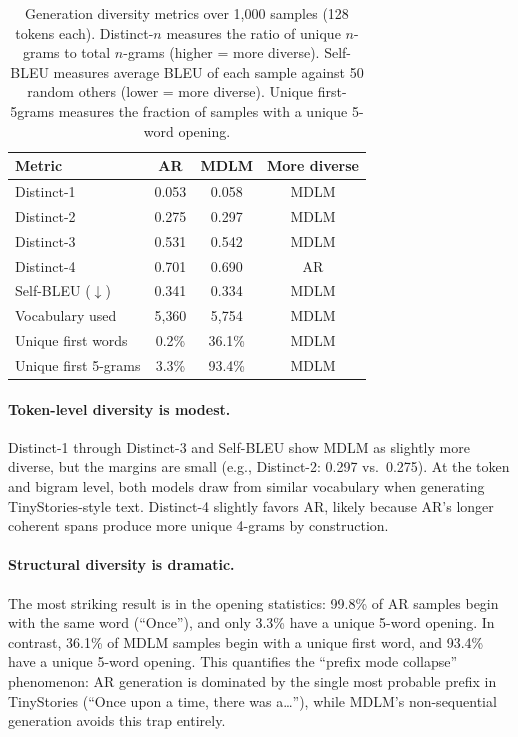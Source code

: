 \documentclass[11pt,a4paper]{article}
\begin{document}
\begin{table}[t]
\centering
\caption{Generation diversity metrics over 1{,}000 samples (128 tokens each). Distinct-$n$ measures the ratio of unique $n$-grams to total $n$-grams (higher = more diverse). Self-BLEU measures average BLEU of each sample against 50 random others (lower = more diverse). Unique first-5grams measures the fraction of samples with a unique 5-word opening.}
\label{tab:diversity}
\smallskip
\begin{tabular}{@{}lccc@{}}
\toprule
Metric & AR & MDLM & More diverse \\
\midrule
Distinct-1 & 0.053 & 0.058 & MDLM \\
Distinct-2 & 0.275 & 0.297 & MDLM \\
Distinct-3 & 0.531 & 0.542 & MDLM \\
Distinct-4 & 0.701 & 0.690 & AR \\
Self-BLEU ($\downarrow$) & 0.341 & 0.334 & MDLM \\
Vocabulary used & 5{,}360 & 5{,}754 & MDLM \\
Unique first words & 0.2\% & 36.1\% & MDLM \\
Unique first 5-grams & 3.3\% & 93.4\% & MDLM \\
\bottomrule
\end{tabular}
\end{table}

\paragraph{Token-level diversity is modest.}
Distinct-1 through Distinct-3 and Self-BLEU show MDLM as slightly more diverse, but the margins are small (e.g., Distinct-2: 0.297 vs.\ 0.275).
At the token and bigram level, both models draw from similar vocabulary when generating TinyStories-style text.
Distinct-4 slightly favors AR, likely because AR's longer coherent spans produce more unique 4-grams by construction.

\paragraph{Structural diversity is dramatic.}
The most striking result is in the opening statistics: 99.8\% of AR samples begin with the same word (``Once''), and only 3.3\% have a unique 5-word opening.
In contrast, 36.1\% of MDLM samples begin with a unique first word, and 93.4\% have a unique 5-word opening.
This quantifies the ``prefix mode collapse'' phenomenon: AR generation is dominated by the single most probable prefix in TinyStories (``Once upon a time, there was a\ldots''), while MDLM's non-sequential generation avoids this trap entirely.
\end{document}
